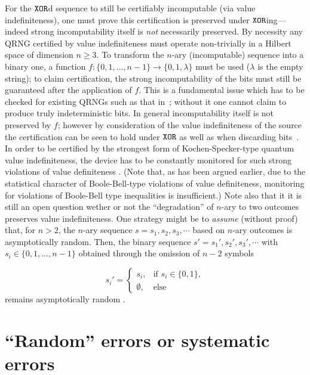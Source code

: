 \documentclass{mscs}
\begin{document}
For the ${\tt XOR}$d sequence to still be certifiably incomputable (via value indefiniteness), one must prove this certification is preserved under ${\tt XOR}$ing---indeed strong incomputability itself is {\em not} necessarily preserved. By necessity any QRNG certified by value indefiniteness must operate non-trivially in a Hilbert space of dimension $n\ge 3$. To transform the $n$-ary (incomputable) sequence into a binary one, a function $f: \{0,1,\dots, n-1\} \to \{0,1,\lambda\}$ must be used ($\lambda$ is the empty string); to claim certification, the strong incomputability of the bits must still be guaranteed after the application of $f$. This is a fundamental issue which has to be checked for  existing QRNGs such as that in~\citet{10.1038/nature09008}; without it one cannot claim to produce truly indeterministic bits. In general incomputability itself is not preserved by $f$; however by consideration of the value indefiniteness of the source the certification can be seen to hold under ${\tt XOR}$ as well as when discarding bits~\citep{Abbott:aa}.
In order to be certified by the strongest form of Kochen-Specker-type quantum value indefiniteness,
the device has to be constantly monitored
for such strong violations of value definiteness \citep{panbdwz,huang-2003,cabello:210401}.
(Note that, as has been argued earlier, due to the statistical character of Boole-Bell-type violations of value definiteness,
monitoring for violations of Boole-Bell type inequalities is insufficient.)
Note also that it it is still an open question wether or not the ``degradation''
of $n$-ary to two outcomes preserves value indefiniteness.
One strategy might be to {\em assume} (without proof)
that, for $n>2$,   the $n$-ary sequence $s=s_1,s_2,s_3,\cdots $ based on $n$-ary outcomes is asymptotically random.
Then, the binary sequence $s'=s_1',s_2',s_3',\cdots $ with $s_i\in \{0,1,\ldots, n-1\}$
obtained through the omission of $n-2$ symbols

\begin{equation*}
s_i' =
	\begin{cases}
		s_i, & \mbox{if } s_i\in \{0,1\},\\
		\emptyset, & \mbox{else }
	\end{cases}
\end{equation*}
remains asymptotically random \citep{calude:02}.
\fi

\section{``Random'' errors or systematic errors}
\end{document}
